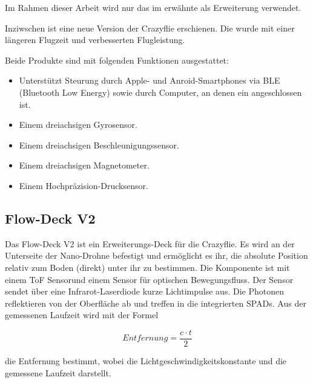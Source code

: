 Im Rahmen dieser Arbeit wird nur das im  erwähnte  als Erweiterung verwendet.

Inziwschen ist eine neue Version der Crazyflie erschienen.
Die  wurde mit einer längeren Flugzeit und verbesserten Flugleistung. 

Beide Produkte sind mit folgenden Funktionen ausgestattet:

\begin{itemize}
    \item Unterstützt Steurung durch Apple- und Anroid-Smartphones via BLE (Bluetooth Low Energy) sowie durch Computer, an denen ein  angeschlossen ist.
    \item Einem dreiachsigen Gyrosensor.\footnotemark
    \item Einem dreiachsigen Beschleunigungssensor.\footnotemark[\value{footnote}]
    \item Einem dreiachsigen Magnetometer.\footnotemark[\value{footnote}]
    \item Einem Hochpräzision-Drucksensor.
\end{itemize}


\subsection{Flow-Deck V2}
\label{sub:v2}

Das Flow-Deck V2 ist ein Erweiterungs-Deck für die Crazyflie. Es wird an der Unterseite der Nano-Drohne befestigt und ermöglicht es ihr, die absolute Position relativ zum Boden (direkt) unter ihr zu bestimmen.
Die Komponente ist mit einem ToF Sensor\footnotemark  und einem  Sensor für optischen Bewegungsfluss.
Der  Sensor sendet über eine Infrarot-Laserdiode kurze Lichtimpulse aus. Die Photonen reflektieren von der Oberfläche ab und treffen in die integrierten SPADs\footnotemark. Aus der gemessenen Laufzeit wird mit der Formel

\[
Entfernung = \frac{c \cdot t}{2}
\]

die Entfernung bestimmt, wobei  die Lichtgeschwindigkeitskonstante und  die gemessene Laufzeit darstellt.


